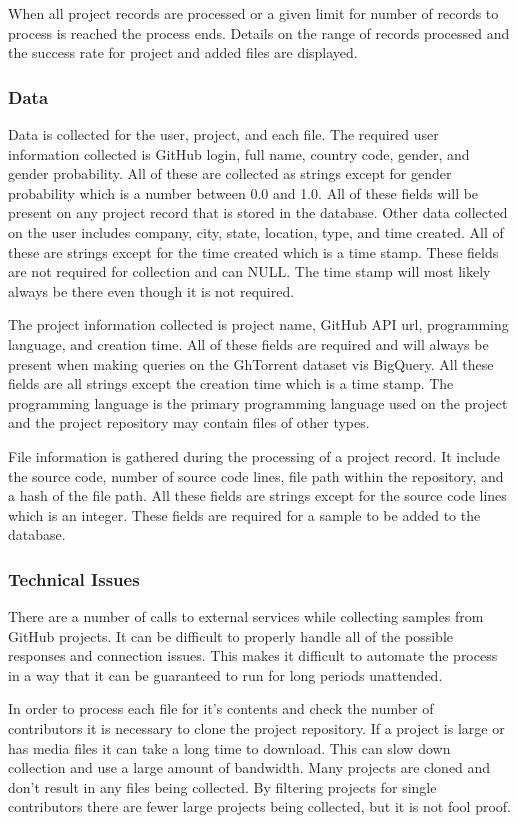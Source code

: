\documentclass{article}
\begin{document}
When all project records are processed or a given limit for number of records to process is reached the process ends. Details on the range of records processed and the success rate for project and added files are displayed.

\subsubsection*{Data}
Data is collected for the user, project, and each file. The required user information collected is GitHub login, full name, country code, gender, and gender probability. All of these are collected as strings except for gender probability which is a number between 0.0 and 1.0. All of these fields will be present on any project record that is stored in the database. Other data collected on the user includes company, city, state, location, type, and time created. All of these are strings except for the time created which is a time stamp. These fields are not required for collection and can NULL. The time stamp will most likely always be there even though it is not required.

The project information collected is project name, GitHub API url, programming language, and creation time. All of these fields are required and will always be present when making queries on the GhTorrent dataset vis BigQuery. All these fields are all strings except the creation time which is a time stamp. The programming language is the primary programming language used on the project and the project repository may contain files of other types.

File information is gathered during the processing of a project record. It include the source code, number of source code lines, file path within the repository, and a hash of the file path. All these fields are strings except for the source code lines which is an integer. These fields are required for a sample to be added to the database.

\subsubsection*{Technical Issues}
There are a number of calls to external services while collecting samples from GitHub projects. It can be difficult to properly handle all of the possible responses and connection issues. This makes it difficult to automate the process in a way that it can be guaranteed to run for long periods unattended.

In order to process each file for it's contents and check the number of contributors it is necessary to clone the project repository. If a project is large or has media files it can take a long time to download. This can slow down collection and use a large amount of bandwidth. Many projects are cloned and don't result in any files being collected. By filtering projects for single contributors there are fewer large projects being collected, but it is not fool proof.
\end{document}
